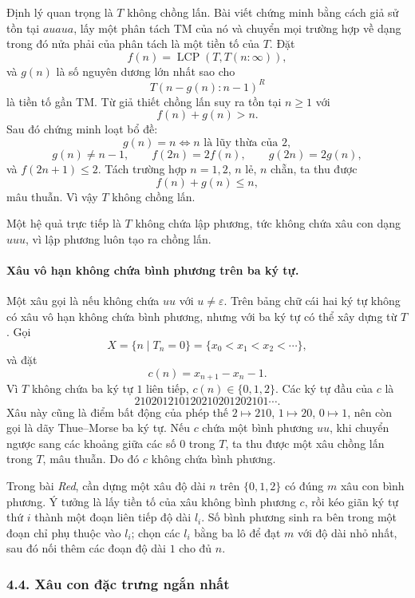 \documentclass[11pt]{article}
\begin{document}
Định lý quan trọng là \(T\) không chồng lấn. Bài viết chứng minh bằng cách giả
sử tồn tại \(auaua\), lấy một phân tách TM của nó và chuyển mọi trường hợp về
dạng trong đó nửa phải của phân tách là một tiền tố của \(T\). Đặt
\[
  f(n)=\operatorname{LCP}(T,T(n:\infty)),
\]
và \(g(n)\) là số nguyên dương lớn nhất sao cho
\[
  T(n-g(n):n-1)^R
\]
là tiền tố gần TM. Từ giả thiết chồng lấn suy ra tồn tại \(n\ge1\) với
\[
  f(n)+g(n)>n.
\]
Sau đó chứng minh loạt bổ đề:
\[
  g(n)=n \Longleftrightarrow n\text{ là lũy thừa của }2,
\]
\[
  g(n)\ne n-1,\qquad f(2n)=2f(n),\qquad g(2n)=2g(n),
\]
và \(f(2n+1)\le2\). Tách trường hợp \(n=1,2\), \(n\) lẻ, \(n\) chẵn, ta thu
được
\[
  f(n)+g(n)\le n,
\]
mâu thuẫn. Vì vậy \(T\) không chồng lấn.

Một hệ quả trực tiếp là \(T\) không chứa lập phương, tức không chứa xâu con
dạng \(uuu\), vì lập phương luôn tạo ra chồng lấn.

\paragraph{Xâu vô hạn không chứa bình phương trên ba ký tự.}
Một xâu gọi là  nếu không chứa \(uu\) với
\(u\ne\varepsilon\). Trên bảng chữ cái hai ký tự không có xâu vô hạn không
chứa bình phương, nhưng với ba ký tự có thể xây dựng từ \(T\). Gọi
\[
  X=\{n\mid T_n=0\}=\{x_0<x_1<x_2<\cdots\},
\]
và đặt
\[
  c(n)=x_{n+1}-x_n-1.
\]
Vì \(T\) không chứa ba ký tự \(1\) liên tiếp, \(c(n)\in\{0,1,2\}\). Các ký tự
đầu của \(c\) là
\[
  210201210120210201202101\cdots .
\]
Xâu này cũng là điểm bất động của phép thế \(2\mapsto210\), \(1\mapsto20\),
\(0\mapsto1\), nên còn gọi là dãy Thue--Morse ba ký tự. Nếu \(c\) chứa một
bình phương \(uu\), khi chuyển ngược sang các khoảng giữa các số \(0\) trong
\(T\), ta thu được một xâu chồng lấn trong \(T\), mâu thuẫn. Do đó \(c\) không
chứa bình phương.

Trong bài \emph{Red}, cần dựng một xâu độ dài \(n\) trên \(\{0,1,2\}\) có đúng
\(m\) xâu con bình phương. Ý tưởng là lấy tiền tố của xâu không bình phương
\(c\), rồi kéo giãn ký tự thứ \(i\) thành một đoạn liên tiếp độ dài \(l_i\). Số
bình phương sinh ra bên trong một đoạn chỉ phụ thuộc vào \(l_i\); chọn các
\(l_i\) bằng ba lô để đạt \(m\) với độ dài nhỏ nhất, sau đó nối thêm các đoạn
độ dài \(1\) cho đủ \(n\).

\subsubsection*{4.4. Xâu con đặc trưng ngắn nhất}
\end{document}
